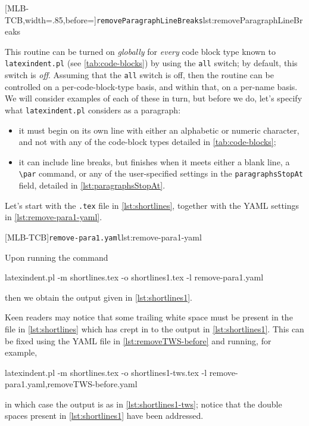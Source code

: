 	[MLB-TCB,width=.85\linewidth,before=\centering]{\texttt{removeParagraphLineBreaks}}{lst:removeParagraphLineBreaks}

	This routine can be turned on \emph{globally} for \emph{every} code block type known to \texttt{latexindent.pl}
	(see \vref{tab:code-blocks}) by using the \texttt{all} switch; by default, this switch is \emph{off}. Assuming
	that the \texttt{all} switch is off, then the routine can be controlled on a per-code-block-type basis, and
	within that, on a per-name basis. We will consider examples of each of these in turn, but
	before we do, let's specify what \texttt{latexindent.pl} considers as a paragraph:
	\begin{itemize}
		\item it must begin on its own line with either an alphabetic or numeric character, and not with any of the
		      code-block types detailed in \vref{tab:code-blocks};
		\item it can include line breaks, but finishes when it meets either a blank line, a \lstinline!\par!
		      command, or any of the user-specified settings in the \texttt{paragraphsStopAt} field,
		      detailed in \vref{lst:paragraphsStopAt}.
	\end{itemize}

	Let's start with the \texttt{.tex} file in \cref{lst:shortlines}, together with the YAML settings in
	\cref{lst:remove-para1-yaml}.

	\begin{minipage}{.45\linewidth}
	\end{minipage}
	\hfill
	\begin{minipage}{.49\linewidth}
		[MLB-TCB]{\texttt{remove-para1.yaml}}{lst:remove-para1-yaml}
	\end{minipage}

	Upon running the command
	\begin{commandshell}
latexindent.pl -m shortlines.tex -o shortlines1.tex -l remove-para1.yaml
\end{commandshell}
	then we obtain the output given in \cref{lst:shortlines1}.


	Keen readers may notice that some trailing white space must be present in the file in \cref{lst:shortlines} which
	has crept in to the output in \cref{lst:shortlines1}. This can be fixed using the YAML file in
	\vref{lst:removeTWS-before} and running, for example,
	\begin{commandshell}
latexindent.pl -m shortlines.tex -o shortlines1-tws.tex -l remove-para1.yaml,removeTWS-before.yaml  
    \end{commandshell}
	in which case the output is as in \cref{lst:shortlines1-tws}; notice that the double spaces present in \cref{lst:shortlines1}
	have been addressed.

